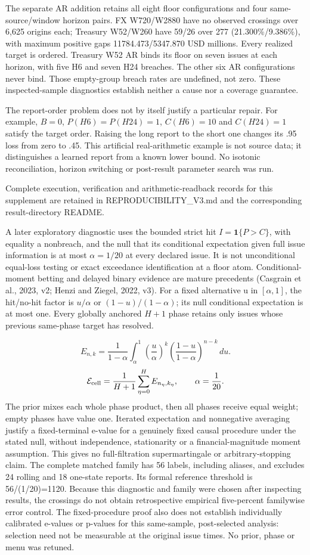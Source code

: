 \documentclass[10pt,a4paper]{article}
\begin{document}
The separate AR addition retains all eight floor configurations and four same-source/window horizon pairs. FX W720/W2880 have no observed crossings over 6,625 origins each; Treasury W52/W260 have 59/26 over 277 (21.300\%/9.386\%), with maximum positive gaps 11784.473/5347.870 USD millions. Every realized target is ordered. Treasury W52 AR binds its floor on seven issues at each horizon, with five H6 and seven H24 breaches. The other six AR configurations never bind. Those empty-group breach rates are undefined, not zero. These inspected-sample diagnostics establish neither a cause nor a coverage guarantee.

The report-order problem does not by itself justify a particular repair. For example, \(B=0\), \(P(H6)=P(H24)=1\), \(C(H6)=10\) and \(C(H24)=1\) satisfy the target order. Raising the long report to the short one changes its .95 loss from zero to .45. This artificial real-arithmetic example is not source data; it distinguishes a learned report from a known lower bound. No isotonic reconciliation, horizon switching or post-result parameter search was run.

Complete execution, verification and arithmetic-readback records for this supplement are retained in REPRODUCIBILITY\_V3.md and the corresponding result-directory README.

A later exploratory diagnostic uses the bounded strict hit \(I=\mathbf1\{P>C\}\), with equality a nonbreach, and the null that its conditional expectation given full issue information is at most \(\alpha=1/20\) at every declared issue. It is not unconditional equal-loss testing or exact exceedance identification at a floor atom. Conditional-moment betting and delayed binary evidence are mature precedents (Casgrain et al., 2023, v2; Henzi and Ziegel, 2022, v3). For a fixed alternative u in \([\alpha,1]\), the hit/no-hit factor is \(u/\alpha\) or \((1-u)/(1-\alpha)\); its null conditional expectation is at most one. Every globally anchored \(H+1\) phase retains only issues whose previous same-phase target has resolved.

\[
E_{n,k}=\frac{1}{1-\alpha}\int_\alpha^1\left(\frac{u}{\alpha}\right)^k\left(\frac{1-u}{1-\alpha}\right)^{n-k}\,du.
\]
\[
\mathcal E_{\rm cell}=\frac{1}{H+1}\sum_{\eta=0}^{H}E_{n_\eta,k_\eta},\qquad\alpha=\frac1{20}.
\]
The prior mixes each whole phase product, then all phases receive equal weight; empty phases have value one. Iterated expectation and nonnegative averaging justify a fixed-terminal e-value for a genuinely fixed causal procedure under the stated null, without independence, stationarity or a financial-magnitude moment assumption. This gives no full-filtration supermartingale or arbitrary-stopping claim. The complete matched family has 56 labels, including aliases, and excludes 24 rolling and 18 one-state reports. Its formal reference threshold is 56/(1/20)=1120. Because this diagnostic and family were chosen after inspecting results, the crossings do not obtain retrospective empirical five-percent familywise error control. The fixed-procedure proof also does not establish individually calibrated e-values or p-values for this same-sample, post-selected analysis: selection need not be measurable at the original issue times. No prior, phase or menu was retuned.
\end{document}
